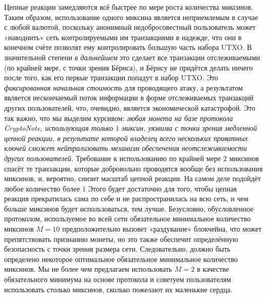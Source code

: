\documentclass{mrl}
\begin{document}
Цепные реакции замедляются всё быстрее по мере роста количества миксинов. Таким образом, использование одного миксина является неприемлемым в случае с любой валютой, поскольку анонимный недобросовестный пользователь может «наводнить» сеть контролируемыми им транзакциями в надежде, что они в конечном счёте позволят ему контролировать большую часть набора UTXO. В значительной степени \emph{в дальнейшем} это сделает все транзакции отслеживаемыми (по крайней мере, с точки зрения Бёрнса), и Бёрнсу не придётся делать ничего после того, как его первые транзакции попадут в набор UTXO. Это \emph{фиксированная начальная стоимость} для проводящего атаку, а результатом является нескончаемый поток информации в форме отслеживаемых транзакций других пользователей, что, очевидно, является экономической катастрофой. Это так важно, что мы выделим курсивом: \emph{любая монета на базе протокола CryptoNote, использующая только $1$ миксин, уязвима с точки зрения медленной цепной реакции, в результате которой владелец всего нескольких приватных ключей сможет нейтрализовать механизм обеспечения неотслеживаемости других пользователей}. Требование к использованию по крайней мере $2$ миксинов спасёт те транзакции, которые добровольно проводятся вообще без использования миксинов, и, вероятно, снизит масштаб цепной реакции. На самом деле подойдёт любое количество более $1$ Этого будет достаточно для того, чтобы цепная реакция прекратилась сама по себе и не распространилась на всю сеть, и чем больше миксинов будет использоваться, тем лучше. Безусловно, обусловленное протоколом, используемое во всей сети обязательное минимальное количество миксинов $M=10$ предположительно вызовет «раздувание» блокчейна, что может препятствовать признанию монеты, но это также обеспечит определённую безопасность с точки зрения размера сети. Следовательно, должно быть определено некоторое оптимальное обязательное минимальное количество миксинов. Мы не более чем предлагаем использовать $M=2$ в качестве обязательного минимума на основе протокола и советуем пользователям использовать столько миксинов, сколько пожелают их маленькие сердца.
\end{document}

